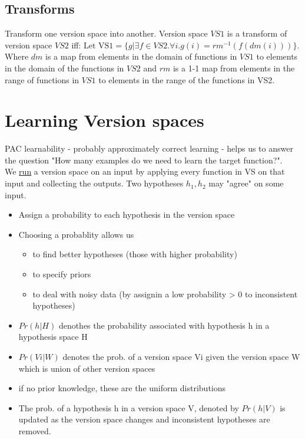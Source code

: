 \subsection{Transforms}
Transform one version space into another. Version space $VS1$ is a transform of version space $VS2$ iff: $\text{Let VS1} = \{g | \exists f \in VS2 . \forall i . g(i) = rm^{-1}(f(dm(i)))\}$. Where $dm$ is a map from elements in the domain of functions in $VS1$ to elements in the domain of the functions in $VS2$ and $rm$ is a 1-1 map from elements in the range of functions in $VS1$ to elements in the range of the functions in VS2.
\section{Learning Version spaces}
PAC learnability - probably approximately correct learning - helps us to answer the question "How many examples do we need to learn the target function?".\\
We \underline{run} a version space on an input by applying every function in VS on that input and collecting the outputs. Two hypotheses $h_1,h_2$ may "agree" on some input.
\begin{itemize}
    \item Assign a probability to each hypothesis in the version space
    \item Choosing a probablity allows us \begin{itemize}
            \item to find better hypotheses (those with higher probability)
            \item to specify priors 
            \item to deal with noisy data (by assignin a low probability > 0 to inconsistent hypotheses)
        \end{itemize}
    \item $Pr(h | H)$ denothes the probability associated with hypothesis h in a hypothesis space H
    \item $Pr(Vi | W) $ denotes the prob. of a version space Vi given the version space W which is union of other version spaces
    \item if no prior knowledge, these are the uniform distributions
    \item The prob. of a hypothesis h in a version space V, denoted by $Pr(h | V)$ is updated as the version space changes and inconsistent hypotheses are removed.
\end{itemize}
